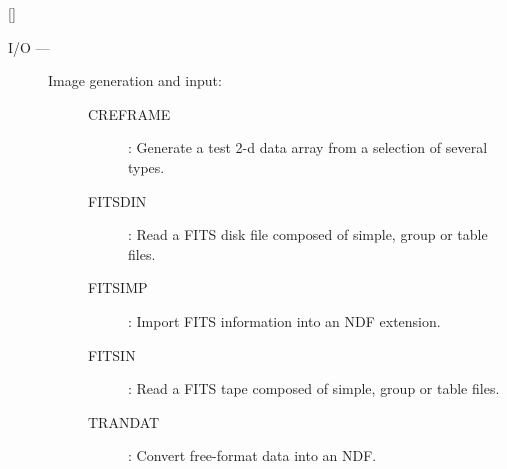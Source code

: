 \hfill []

\vspace{2mm}

\begin{description}

\item [I/O ---]
\begin{description}
\item [Image generation and input:]\hfill
\begin {description}
\item [CREFRAME]:
 Generate a test 2-d data array from a selection of several types.
\item [FITSDIN]:
 Read a FITS disk file composed of simple, group or table files.
\item [FITSIMP]:
 Import FITS information into an NDF extension.
\item [FITSIN]:
 Read a FITS tape composed of simple, group or table files.
\item [TRANDAT]:
 Convert free-format data into an NDF.
\end {description}
\end {description}


\end{description}
